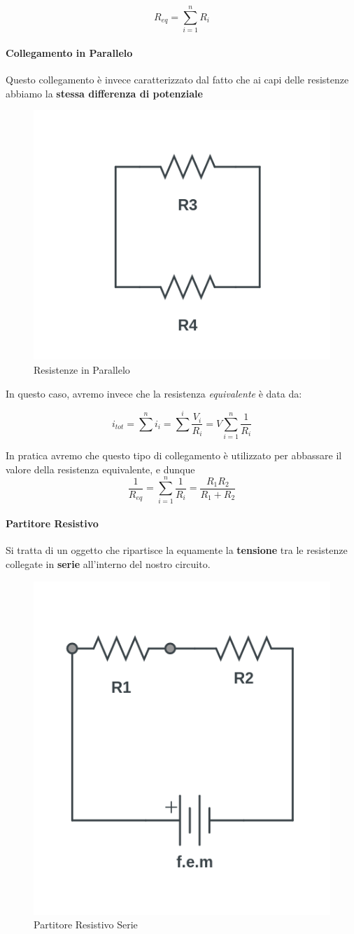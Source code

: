$$ R_{eq} = \sum_{i=1}^n R_i $$

\paragraph{Collegamento in Parallelo}
Questo collegamento è invece caratterizzato dal fatto che ai capi delle resistenze abbiamo la \textbf{stessa differenza di potenziale}

\begin{figure}[th]
	\centering
	\includegraphics[width=0.5\linewidth]{Media/Resistenze_parallelo}
	\caption{Resistenze in Parallelo}
	\label{fig:resistenzeparallelo}
\end{figure}

In questo caso, avremo invece che la resistenza \textit{equivalente} è data da: 

\begin{equation}
	\label{eq_parallelo}
	i_{tot} = \sum^n i_i = \sum^i  \frac{V_i}{R_i} = V \sum_{i=1}^n \frac{1}{R_i}
\end{equation}

In pratica avremo che questo tipo di collegamento è utilizzato per abbassare il valore della resistenza equivalente, e dunque $$\frac{1}{R_{eq}} = \sum_{i=1}^n \frac{1}{R_i} = \frac{R_1R_2}{R_1 + R_2}$$

\paragraph{Partitore Resistivo}
Si tratta di un oggetto che ripartisce la equamente la \textbf{tensione} tra le resistenze collegate in \textbf{serie} all'interno del nostro circuito. 

\begin{figure}[th]
	\centering
	\includegraphics[width=0.5\linewidth]{Media/partitore_resistivo}
	\caption{Partitore Resistivo Serie}
	\label{fig:partitoreresistivo}
\end{figure}

